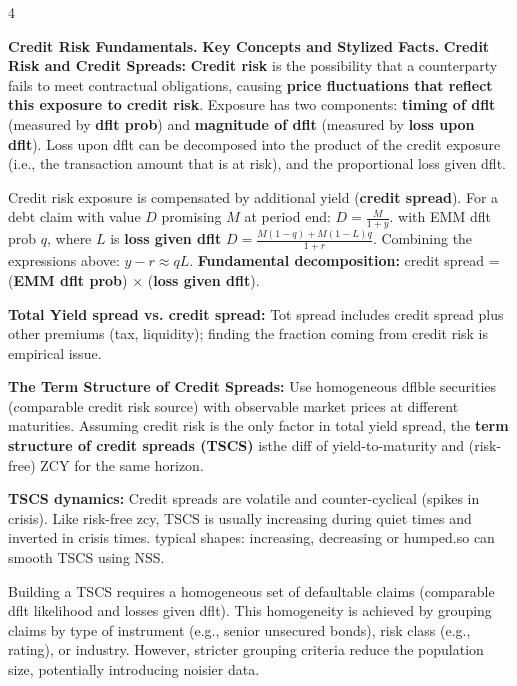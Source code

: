 \documentclass[landscape]{article}
\newcommand{\concept}[1]{\textcolor{conceptcolor}{\textbf{#1}}}
\newcommand{\keyterm}[1]{\textcolor{keycolor}{\textbf{#1}}}
\begin{document}
\begin{multicols}{4}
\setlength{\multicolsep}{0pt}

\textcolor{sectioncolor}{\textbf{Credit Risk Fundamentals.}}
\textcolor{subsectioncolor}{\textbf{Key Concepts and Stylized Facts.}}
\textcolor{subsubsectioncolor}{\textbf{Credit Risk and Credit Spreads:}} \textbf{Credit risk} is the possibility that a counterparty fails to meet contractual obligations, causing \textbf{price fluctuations that reflect this exposure to credit risk}. Exposure has two components: \textbf{timing of dflt} (measured by \textbf{dflt prob}) and \textbf{magnitude of dflt} (measured by \textbf{loss upon dflt}). Loss upon dflt can be decomposed into the product of the credit exposure (i.e., 
the transaction amount that is at risk), and the proportional loss given dflt.

Credit risk exposure is compensated by additional yield (\textbf{credit spread}). For a debt claim with value $D$ promising $M$ at period end: $D = \frac{M}{1 + y}$. with EMM dflt prob $q$, where $L$ is \keyterm{loss given dflt} $D = \frac{M(1-q) + M(1-L)q}{1 + r}$. Combining the expressions above: $y - r \approx qL$. \textbf{Fundamental decomposition:} credit spread = (\concept{EMM dflt prob}) $\times$ (\keyterm{loss given dflt}).

\textbf{Total Yield spread vs. credit spread:} Tot spread includes credit spread plus other premiums (tax, liquidity); finding the fraction coming from credit risk is empirical issue.

\textcolor{subsubsectioncolor}{\textbf{The Term Structure of Credit Spreads:}} Use homogeneous dflble securities (comparable credit risk source) with observable market prices at different maturities. Assuming credit risk is the only factor in total yield spread, the \textbf{term structure of credit spreads (TSCS)} isthe diff of yield-to-maturity and (risk-free) ZCY for the same horizon.

\textbf{TSCS dynamics:} Credit spreads are volatile and counter-cyclical (spikes in crisis). Like risk-free zcy, TSCS is usually increasing during quiet times and inverted in crisis times. typical shapes: increasing, decreasing or humped.so can smooth TSCS using NSS.

Building a TSCS requires a homogeneous set of defaultable claims (comparable dflt likelihood and losses given dflt). This homogeneity is achieved by grouping claims by type of instrument (e.g., senior unsecured bonds), risk class (e.g., rating), or industry. However, stricter grouping criteria reduce the population size, potentially introducing noisier data.


\end{multicols}
\end{document}
